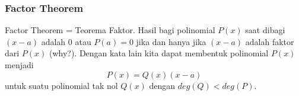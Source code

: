 \subsubsection{Factor Theorem}
Factor Theorem = Teorema Faktor.
Hasil bagi polinomial $P(x)$ saat dibagi $(x-a)$ adalah $0$ atau $P(a)=0$ jika dan hanya jika $(x-a)$ adalah faktor dari $P(x)$ (why?).
Dengan kata lain kita dapat membentuk polinomial $P(x)$ menjadi
$$P(x)=Q(x)(x-a)$$
untuk suatu polinomial tak nol $Q(x)$ dengan $deg(Q)<deg(P)$.